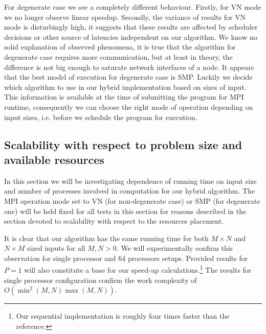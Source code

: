 For degenerate case we see a completely different behaviour.
Firstly, for VN mode we no longer observe linear speedup.
Secondly, the variance of results for VN mode is disturbingly high, it suggests that these results are affected by scheduler decisions or other source of latencies independent on our algorithm.
We know no solid explanation of observed phenomena, it is true that the algorithm for degenerate case requires more communication, but at least in theory, the difference is not big enough to saturate network interfaces of a node.
It appears that the best model of execution for degenerate case is SMP.
Luckily we decide which algorithm to use in our hybrid implementation based on sizes of input.
This information is available at the time of submitting the program for MPI runtime, consequently we can choose the right mode of operation depending on input sizes, i.e. before we schedule the program for execution.

\subsection*{Scalability with respect to problem size and available resources}

In this section we will be investigating dependence of running time on input size and number of processes involved in computation for our hybrid algorithm.
The MPI operation mode set to VN (for non-degenerate case) or SMP (for degenerate one) will be held fixed for all tests in this section for reasons described in the section devoted to scalability with respect to the resources placement.

It is clear that our algorithm has the same running time for both $M \times N$ and $N \times M$ sized inputs for all $M, N > 0$.
We will experimentally confirm this observation for single processor and $64$ processors setups.
Provided results for $P = 1$ will also constitute a base for our speed-up calculations.\footnote{Our sequential implementation is roughly four times faster than the reference.}
The results for single processor configuration confirm the work complexity of $O(\min^2(M, N) \max(M, N))$.

